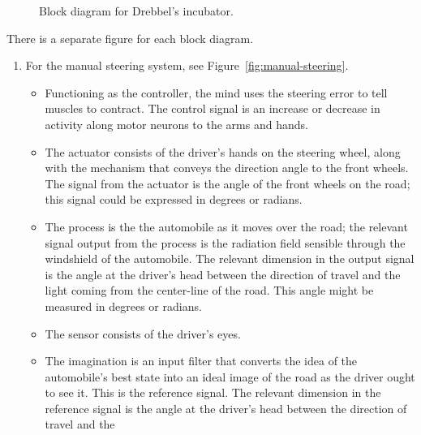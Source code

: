 \begin{figure}
   \begin{center}
      \begin{small}
         
      \end{small}
      \caption{Block diagram for Drebbel's incubator.}
      \label{fig:incubator}
   \end{center}
\end{figure}

\begin{solution}
   There is a separate figure for each block diagram.
   \begin{enumerate}
      \item For the manual steering system, see
         Figure~\ref{fig:manual-steering}.
         \begin{itemize}
            \item Functioning as the controller, the mind uses the steering
               error to tell muscles to contract. The control signal is an
               increase or decrease in activity along motor neurons to the arms
               and hands.
            \item The actuator consists of the driver's hands on the steering
               wheel, along with the mechanism that conveys the direction angle
               to the front wheels. The signal from the actuator is the angle
               of the front wheels on the road; this signal could be expressed
               in degrees or radians.
            \item The process is the the automobile as it moves over the road;
               the relevant signal output from the process is the radiation
               field sensible through the windshield of the automobile. The
               relevant dimension in the output signal is the angle at the
               driver's head between the direction of travel and the light
               coming from the center-line of the road. This angle might be
               measured in degrees or radians.
            \item The sensor consists of the driver's eyes.
            \item The imagination is an input filter that converts the idea of
               the automobile's best state into an ideal image of the road as
               the driver ought to see it.  This is the reference signal. The
               relevant dimension in the reference signal is the angle at the
               driver's head between the direction of travel and the

\end{itemize}
\end{enumerate}
\end{solution}
